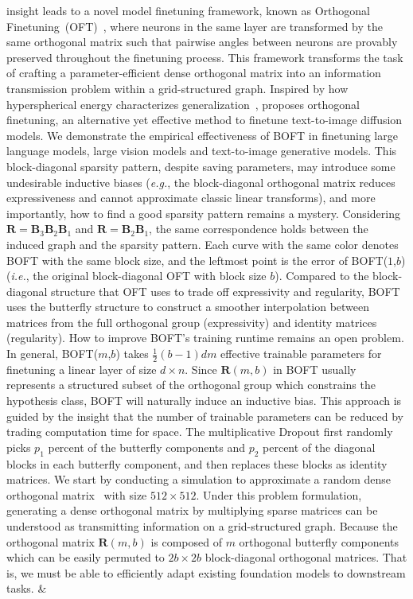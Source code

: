 insight leads to a novel model finetuning framework, known as Orthogonal Finetuning~(OFT)~\cite{qiu2023controlling}, where neurons in the same layer are transformed by the same orthogonal matrix such that pairwise angles between neurons are provably preserved throughout the finetuning process. This framework transforms the task of crafting a parameter-efficient dense orthogonal matrix into an information transmission problem within a grid-structured graph. Inspired by how hyperspherical energy characterizes generalization~\cite{liu2018learning,liu2021orthogonal}, \cite{qiu2023controlling} proposes orthogonal finetuning, an alternative yet effective method to finetune text-to-image diffusion models. We demonstrate the empirical effectiveness of BOFT in finetuning large language models, large vision models and text-to-image generative models. This block-diagonal sparsity pattern, despite saving parameters, may introduce some undesirable inductive biases (\emph{e.g.}, the block-diagonal orthogonal matrix reduces expressiveness and cannot approximate classic linear transforms), and more importantly, how to find a good sparsity pattern remains a mystery. Considering $\bm{R}=\bm{B}_3\bm{B}_2\bm{B}_1$ and $\bm{R}=\bm{B}_2\bm{B}_1$, the same correspondence holds between the induced graph and the sparsity pattern. Each curve with the same color denotes BOFT with the same block size, and the leftmost point is the error of BOFT($1$,$b$) (\emph{i.e.}, the original block-diagonal OFT with block size $b$). Compared to the block-diagonal structure that OFT uses to trade off expressivity and regularity, BOFT uses the butterfly structure to construct a smoother interpolation between matrices from the full orthogonal group (expressivity) and identity matrices (regularity). How to improve BOFT's training runtime remains an open problem. In general, BOFT($m$,$b$) takes $\frac{1}{2}(b-1)dm$ effective trainable parameters for finetuning a linear layer of size $d\times n$. Since $\bm{R}(m,b)$ in BOFT usually represents a structured subset of the orthogonal group which constrains the hypothesis class, BOFT will naturally induce an inductive bias. This approach is guided by the insight that the number of trainable parameters can be reduced by trading computation time for space. The multiplicative Dropout first randomly picks $p_1$ percent of the butterfly components and $p_2$ percent of the diagonal blocks in each butterfly component, and then replaces these blocks as identity matrices. We start by conducting a simulation to approximate a random dense orthogonal matrix~\cite{anderson1987generation} with size $512\times 512$. Under this problem formulation, generating a dense orthogonal matrix by multiplying sparse matrices can be understood as transmitting information on a grid-structured graph. Because the orthogonal matrix $\bm{R}(m,b)$ is composed of $m$ orthogonal butterfly components which can be easily permuted to $2b\times 2b$ block-diagonal orthogonal matrices. That is, we must be able to efficiently adapt existing foundation models to downstream tasks. &  \\
